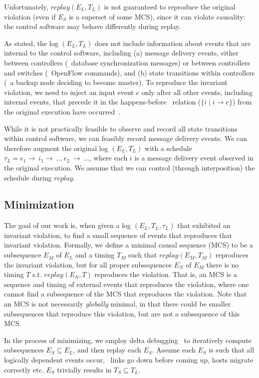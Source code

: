 Unfortunately, $replay(E_L, T_L)$ is not guaranteed to reproduce the
original violation (even if $E_S$ is a superset of some MCS), since it can violate
causality: the control software may behave
differently during replay.

As stated, the log $(E_L, T_L)$ does not include
information about events that are internal to the control software, including
(a) message delivery events, either between controllers (\eg~database
synchronization messages) or
between controllers and switches (\eg~OpenFlow commands), and (b) state transitions
within controllers (\eg~a backup node deciding to become master).
To reproduce the invariant violation,
we need to inject an input event $e$ only after all other
events, including internal events,
that precede it in the
happens-before~\cite{Lamport:1978:TCO:359545.359563}
relation ($\{i \mid i \rightarrow e\}$) from the original execution have
occurred~\cite{tel2000introduction}.

While it is not practically feasible to observe and record all state
transitions within control software, we can feasibly record message delivery
events. We can therefore augment the original log $(E_L, T_L)$ with a schedule
$\tau_L = e_1\rightarrow~i_1\rightarrow~\dots~e_2~\rightarrow~\dots$, where
each $i$ is a message delivery event observed in the original execution.
We assume that we can control (through interposition) the schedule during
$replay$.

\subsection{Minimization}

The goal of our work is, when given a log $(E_L,
T_L, \tau_L)$ that exhibited an
invariant violation, to find a small sequence of events that reproduces that
invariant violation. Formally, we define a minimal causal sequence (MCS)
to be a subsequence $E_M$
of $E_L$ and a timing $T_M$ such
that $replay(E_M,T_M)$ reproduces the invariant violation, but for all proper
subsequences $E_N$ of $E_M$
there is no timing $T$ s.t. $replay(E_N,T)$ reproduces the violation.
That is, an MCS is a sequence and timing of external events that reproduces the violation,
where one cannot find a subsequence of the MCS that reproduces the violation.
Note that an MCS is not necessarily {\em globally} minimal, in that there could be smaller
subsequences that reproduce this violation, but are not a subsequence of this MCS.

In the process of minimizing, we employ delta debugging~\cite{Zeller:1999:YMP:318773.318946}
to iteratively compute
subsequences $E_S\subseteq E_L$, and then replay each $E_S$. Assume each $E_S$ is such
that all logically dependent events occur, \eg~links go down before coming up,
hosts migrate correctly etc. $E_S$ trivially results in
$T_S\subseteq T_L$.

